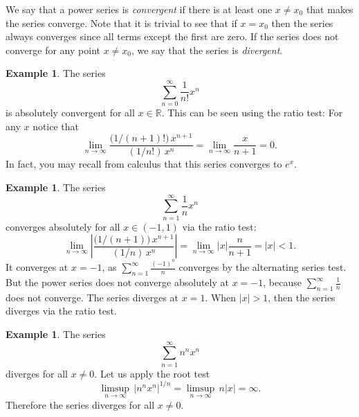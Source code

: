 \documentclass[12pt]{book}
\newcommand{\abs}[1]{\left\lvert {#1} \right\rvert}
\newcommand{\R}{{\mathbb{R}}}
\theoremstyle{plain}
\theoremstyle{remark}
\theoremstyle{definition}
\theoremstyle{exercise}
\theoremstyle{example}
\newtheorem{example}[thm]{Example}
\begin{document}
We say that a power series is
\emph{convergent} if
there is at least one $x \not= x_0$ that makes the series converge.
Note that it is trivial to see that if $x=x_0$ then the series always
converges since all terms except the first are zero.
If the series does not converge for any point $x \not= x_0$, we say that
the series is \emph{divergent}.

\begin{example} \label{ps:expex}
The series
\begin{equation*}
\sum_{n=0}^\infty \frac{1}{n!} x^n
\end{equation*}
is absolutely convergent for all $x \in \R$.  This can be seen using the ratio test:
For any $x$ notice that
\begin{equation*}
\lim_{n \to \infty}
\frac{\bigl(1/(n+1)!\bigr) \, x^{n+1}}{(1/n!) \, x^{n}}
=
\lim_{n \to \infty}
\frac{x}{n+1}
=
0.
\end{equation*}
In fact, you may recall from calculus that this series converges to $e^x$.
\end{example}

\begin{example} \label{ps:1kex}
The series
\begin{equation*}
\sum_{n=1}^\infty \frac{1}{n} x^n
\end{equation*}
converges absolutely for all $x \in (-1,1)$ via the ratio test:
\begin{equation*}
\lim_{n \to \infty}
\abs{
\frac{\bigl(1/(n+1) \bigr) \, x^{n+1}}{(1/n) \, x^{n}}
}
=
\lim_{n \to \infty}
\abs{x} \frac{n}{n+1}
=
\abs{x} < 1 .
\end{equation*}
It converges at $x=-1$,
as
$\sum_{n=1}^\infty \frac{{(-1)}^n}{n}$ converges
by the alternating series
test.
But the power series does not converge absolutely at $x=-1$, because
$\sum_{n=1}^\infty \frac{1}{n}$ does not converge.
The series
diverges at $x=1$.
When $\abs{x} > 1$, then the series diverges via the ratio test.
\end{example}

\begin{example} \label{ps:divergeex}
The series
\begin{equation*}
\sum_{n=1}^\infty n^n x^n
\end{equation*}
diverges for all $x \not= 0$.  Let us apply the root test
\begin{equation*}
\limsup_{n\to\infty}
\,
\abs{n^n x^n}^{1/n}
=
\limsup_{n\to\infty}
\,
n \abs{x}
= \infty .
\end{equation*}
Therefore the series diverges for all $x \not= 0$.
\end{example}
\end{document}
